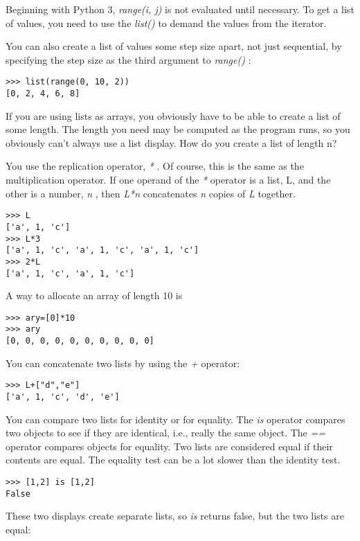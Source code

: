 Beginning with Python 3, \emph{range(i, j)} is not evaluated until necessary.
To get a list of values, you need to use the \emph{list()} to demand
the values from the iterator.


You can also create a list of
values some step size apart, not just sequential, by specifying the step
size as the third argument to \emph{range()} :

\begin{verbatim}
>>> list(range(0, 10, 2))
[0, 2, 4, 6, 8]
\end{verbatim}

If you are using lists as arrays,
you obviously have to be able to create a list of some length. The
length you need may be computed as the program runs, so you obviously
can't always use a list display. How do you create a list of length n?

You use the replication operator,
\emph{*} . Of course, this is the same as the multiplication operator.
If one operand of the \emph{*} operator is a list, L, and the other is a
number, \emph{n} , then \emph{L*n} concatenates \emph{n} copies of
\emph{L} together.


\begin{verbatim}
>>> L
['a', 1, 'c']
>>> L*3
['a', 1, 'c', 'a', 1, 'c', 'a', 1, 'c']
>>> 2*L
['a', 1, 'c', 'a', 1, 'c']
\end{verbatim}


A way to allocate an array of length 10 is

\begin{verbatim}
>>> ary=[0]*10
>>> ary
[0, 0, 0, 0, 0, 0, 0, 0, 0, 0]
\end{verbatim}

You can concatenate two lists by
using the \emph{+} operator:

\begin{verbatim}
>>> L+["d","e"]
['a', 1, 'c', 'd', 'e']
\end{verbatim}

You can compare two lists for
identity or for equality. The \emph{is} operator compares two objects to
see if they are identical, i.e., really the same object. The \emph{==}
operator compares objects for equality. Two lists are considered equal
if their contents are equal. The equality test can be a lot slower than
the identity test.

\begin{verbatim}
>>> [1,2] is [1,2]
False
\end{verbatim}

These two displays create separate
lists, so \emph{is} returns false, but the two lists are equal:

